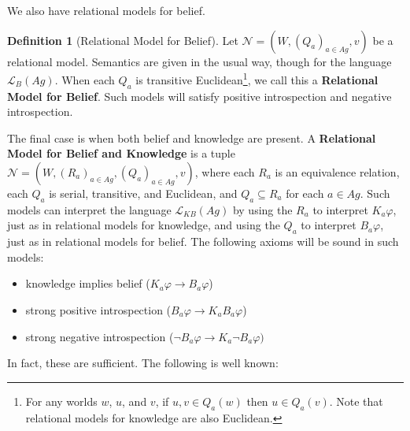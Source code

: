 \documentclass[11pt]{article}
\theoremstyle{definition}
\newtheorem{definition}{Definition}[section]
\newcommand{\defin}[1]{\textbf{#1}}
\renewcommand{\phi}{\varphi}
\newcommand{\lthen}{\rightarrow}
\renewcommand{\L}{\mathcal{L}}
\newcommand{\N}{\mathcal{N}}
\begin{document}
	We also have relational models for belief.
	
		\begin{definition}[Relational Model for Belief] Let $\N = (W,(Q_{a})_{a \in Ag},v)$ be a relational model. Semantics are given in the usual way, though for the language $\L_{B}(Ag)$. When each $Q_a$ is transitive Euclidean\footnote{For any worlds $w$, $u$, and $v$, if $u,v\in Q_a(w)$ then $u\in Q_a(v)$. Note that relational models for knowledge are also Euclidean.}, we call this a \defin{Relational Model for Belief}. Such models will satisfy positive introspection and negative introspection.
	\end{definition}

	The final case is when both belief and knowledge are present. A \defin{Relational Model for Belief and Knowledge} is a tuple $\N=(W,(R_{a})_{a \in Ag},(Q_{a})_{a \in Ag},v)$, where each $R_a$ is an equivalence relation, each $Q_a$ is serial, transitive, and Euclidean, and $Q_a\subseteq R_a$ for each $a\in Ag$. Such models can interpret the language $\L_{KB}(Ag)$ by using the $R_a$ to interpret $K_a\varphi$, just as in relational models for knowledge, and using the $Q_a$ to interpret $B_a\varphi$, just as in relational models for belief. The following axioms will be sound in such models:
	
	\begin{itemize}
	\item knowledge implies belief ($K_{a} \phi \lthen B_{a} \phi$)
	\item strong positive introspection ($B_{a} \phi \lthen K_{a} B_{a} \phi$)
	\item strong negative introspection ($\lnot B_{a} \phi \lthen K_{a} \lnot B_{a} \phi)$
	\end{itemize}

	In fact, these are sufficient. The following is well known: \cite{DC5, BelSimp,Bjorndahl2024}
	
\end{document}
